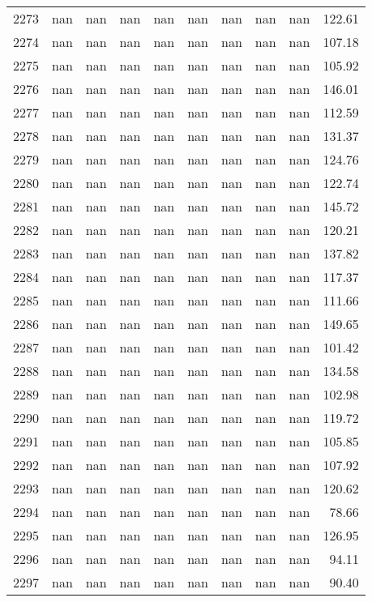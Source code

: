\begin{tabular}{lrrrrrrrrr}
2273 & nan & nan & nan & nan & nan & nan & nan & nan & 122.61 \\
2274 & nan & nan & nan & nan & nan & nan & nan & nan & 107.18 \\
2275 & nan & nan & nan & nan & nan & nan & nan & nan & 105.92 \\
2276 & nan & nan & nan & nan & nan & nan & nan & nan & 146.01 \\
2277 & nan & nan & nan & nan & nan & nan & nan & nan & 112.59 \\
2278 & nan & nan & nan & nan & nan & nan & nan & nan & 131.37 \\
2279 & nan & nan & nan & nan & nan & nan & nan & nan & 124.76 \\
2280 & nan & nan & nan & nan & nan & nan & nan & nan & 122.74 \\
2281 & nan & nan & nan & nan & nan & nan & nan & nan & 145.72 \\
2282 & nan & nan & nan & nan & nan & nan & nan & nan & 120.21 \\
2283 & nan & nan & nan & nan & nan & nan & nan & nan & 137.82 \\
2284 & nan & nan & nan & nan & nan & nan & nan & nan & 117.37 \\
2285 & nan & nan & nan & nan & nan & nan & nan & nan & 111.66 \\
2286 & nan & nan & nan & nan & nan & nan & nan & nan & 149.65 \\
2287 & nan & nan & nan & nan & nan & nan & nan & nan & 101.42 \\
2288 & nan & nan & nan & nan & nan & nan & nan & nan & 134.58 \\
2289 & nan & nan & nan & nan & nan & nan & nan & nan & 102.98 \\
2290 & nan & nan & nan & nan & nan & nan & nan & nan & 119.72 \\
2291 & nan & nan & nan & nan & nan & nan & nan & nan & 105.85 \\
2292 & nan & nan & nan & nan & nan & nan & nan & nan & 107.92 \\
2293 & nan & nan & nan & nan & nan & nan & nan & nan & 120.62 \\
2294 & nan & nan & nan & nan & nan & nan & nan & nan & 78.66 \\
2295 & nan & nan & nan & nan & nan & nan & nan & nan & 126.95 \\
2296 & nan & nan & nan & nan & nan & nan & nan & nan & 94.11 \\
2297 & nan & nan & nan & nan & nan & nan & nan & nan & 90.40 \\

\end{tabular}
